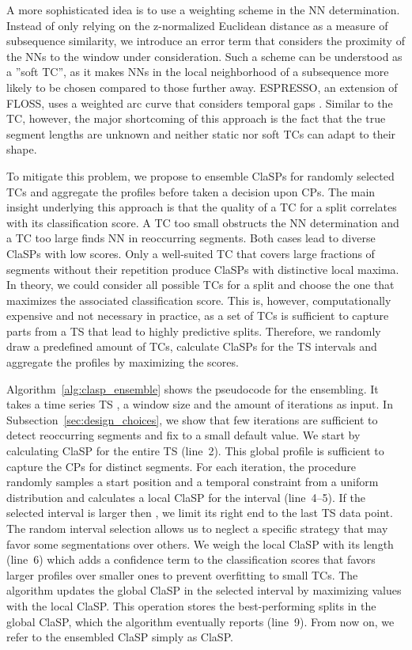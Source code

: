 \documentclass[pdflatex,sn-basic]{sn-jnl}
\begin{document}
A more sophisticated idea is to use a weighting scheme in the NN determination. Instead of only relying on the z-normalized Euclidean distance as a measure of subsequence similarity, we introduce an error term that considers the proximity of the NNs to the window under consideration. Such a scheme can be understood as a ''soft TC'', as it makes NNs in the local neighborhood of a subsequence more likely to be chosen compared to those further away. ESPRESSO, an extension of FLOSS, uses a weighted arc curve that considers temporal gaps \citep{Deldari2020ESPRESSOEA}. Similar to the TC, however, the major shortcoming of this approach is the fact that the true segment lengths are unknown and neither static nor soft TCs can adapt to their shape.  

To mitigate this problem, we propose to ensemble ClaSPs for randomly selected TCs and aggregate the profiles before taken a decision upon CPs. The main insight underlying this approach is that the quality of a TC for a split correlates with its classification score. A TC too small obstructs the NN determination and a TC too large finds NN in reoccurring segments. Both cases lead to diverse ClaSPs with low scores. Only a well-suited TC that covers large fractions of segments without their repetition produce ClaSPs with distinctive local maxima. In theory, we could consider all possible TCs for a split and choose the one that maximizes the associated classification score. This is, however, computationally expensive and not necessary in practice, as a set of TCs is sufficient to capture parts from a TS that lead to highly predictive splits. Therefore, we randomly draw a predefined amount of TCs, calculate ClaSPs for the TS intervals and aggregate the profiles by maximizing the scores.

Algorithm~\ref{alg:clasp_ensemble} shows the pseudocode for the ensembling. It takes a time series TS , a window size  and the amount of iterations  as input.  In Subsection~\ref{sec:design_choices}, we show that few iterations are sufficient to detect reoccurring segments and fix  to a small default value. We start by calculating ClaSP for the entire TS (line~2). This global profile is sufficient to capture the CPs for distinct segments. For each iteration, the procedure randomly samples a start position  and a temporal constraint  from a uniform distribution and calculates a local ClaSP for the interval  (line~4--5). If the selected interval is larger then , we limit its right end to the last TS data point. The random interval selection allows us to neglect a specific strategy that may favor some segmentations over others. We weigh the local ClaSP with its  length (line~6) which adds a confidence term to the classification scores that favors larger profiles over smaller ones to prevent overfitting to small TCs. The algorithm updates the global ClaSP in the selected interval by maximizing values with the local ClaSP. This operation stores the best-performing splits in the global ClaSP, which the algorithm eventually reports (line~9). From now on, we refer to the ensembled ClaSP simply as ClaSP.
\end{document}
